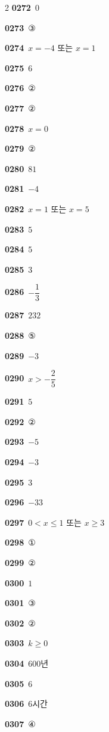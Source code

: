 \documentclass[10pt,a4paper]{article}
\begin{document}
\begin{multicols}{2}
\noindent\textbf{0272}\ $0$\par
\noindent\textbf{0273}\ ③\par
\noindent\textbf{0274}\ $x=-4$ 또는 $x=1$\par
\noindent\textbf{0275}\ $6$\par
\noindent\textbf{0276}\ ②\par
\noindent\textbf{0277}\ ②\par
\noindent\textbf{0278}\ $x=0$\par
\noindent\textbf{0279}\ ②\par
\noindent\textbf{0280}\ $81$\par
\noindent\textbf{0281}\ $-4$\par
\noindent\textbf{0282}\ $x=1$ 또는 $x=5$\par
\noindent\textbf{0283}\ $5$\par
\noindent\textbf{0284}\ $5$\par
\noindent\textbf{0285}\ $3$\par
\noindent\textbf{0286}\ $-\dfrac{1}{3}$\par
\noindent\textbf{0287}\ $232$\par
\noindent\textbf{0288}\ ⑤\par
\noindent\textbf{0289}\ $-3$\par
\noindent\textbf{0290}\ $x>-\dfrac{2}{5}$\par
\noindent\textbf{0291}\ $5$\par
\noindent\textbf{0292}\ ②\par
\noindent\textbf{0293}\ $-5$\par
\noindent\textbf{0294}\ $-3$\par
\noindent\textbf{0295}\ $3$\par
\noindent\textbf{0296}\ $-33$\par
\noindent\textbf{0297}\ $0<x\le 1$ 또는 $x\ge 3$\par
\noindent\textbf{0298}\ ①\par
\noindent\textbf{0299}\ ②\par
\noindent\textbf{0300}\ $1$\par
\noindent\textbf{0301}\ ③\par
\noindent\textbf{0302}\ ②\par
\noindent\textbf{0303}\ $k\ge 0$\par
\noindent\textbf{0304}\ $600$년\par
\noindent\textbf{0305}\ $6$\par
\noindent\textbf{0306}\ $6$시간\par
\noindent\textbf{0307}\ ④\par

\end{multicols}
\end{document}
